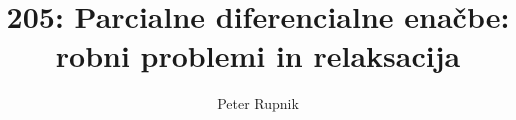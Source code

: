 \documentclass[a4paper,oneside,12pt]{article}
\title{205: Parcialne diferencialne enačbe: robni problemi in relaksacija}
\author{Peter Rupnik}
\begin{document}
\maketitle

\section{}

\section{}
\end{document}
